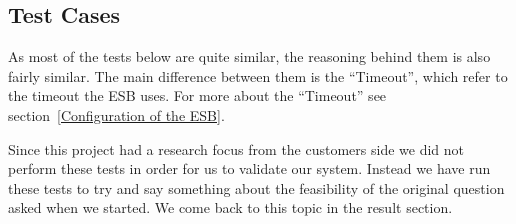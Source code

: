 	\subsection{Test Cases}\label{Testing:Cases}

	As most of the tests below are quite similar, the reasoning behind them is also fairly similar. The main difference between them is the “Timeout”, which refer to the timeout the ESB uses. For more about the “Timeout” see section~\ref{Configuration of the ESB}.

	Since this project had a research focus from the customers side we did not perform these tests in order for us to validate our system. Instead we have run these tests to try and say something about the feasibility of the original question asked when we started. We come back to this topic in the result section.\\
    
